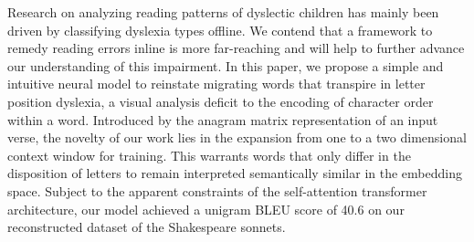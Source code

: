 Research on analyzing reading patterns of dyslectic children has mainly been driven by classifying dyslexia types offline. We contend that a framework to remedy reading errors inline is more far-reaching and will help to further advance our understanding of this impairment. In this paper, we propose a simple and intuitive neural model to reinstate migrating words that transpire in letter position dyslexia, a visual analysis deficit to the encoding of character order within a word. Introduced by the anagram matrix representation of an input verse, the novelty of our work lies in the expansion from one to a two dimensional context window for training. This warrants words that only differ in the disposition of letters to remain interpreted semantically similar in the embedding space. Subject to the apparent constraints of the self-attention transformer architecture, our model achieved a unigram BLEU score of 40.6 on our reconstructed dataset of the Shakespeare sonnets.
